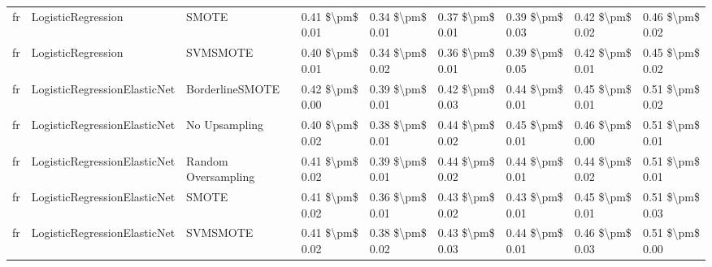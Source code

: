 \begin{tabular}{lllllllll}
      fr &              LogisticRegression &                         SMOTE & 0.41 \$\textbackslash pm\$ 0.01 &           0.34 \$\textbackslash pm\$ 0.01 &       0.37 \$\textbackslash pm\$ 0.01 &        0.39 \$\textbackslash pm\$ 0.03 &                         0.42 \$\textbackslash pm\$ 0.02 &     0.46 \$\textbackslash pm\$ 0.02 \\
      fr &              LogisticRegression &                      SVMSMOTE & 0.40 \$\textbackslash pm\$ 0.01 &           0.34 \$\textbackslash pm\$ 0.02 &       0.36 \$\textbackslash pm\$ 0.01 &        0.39 \$\textbackslash pm\$ 0.05 &                         0.42 \$\textbackslash pm\$ 0.01 &     0.45 \$\textbackslash pm\$ 0.02 \\
      fr &    LogisticRegressionElasticNet &               BorderlineSMOTE & 0.42 \$\textbackslash pm\$ 0.00 &           0.39 \$\textbackslash pm\$ 0.01 &       0.42 \$\textbackslash pm\$ 0.03 &        0.44 \$\textbackslash pm\$ 0.01 &                         0.45 \$\textbackslash pm\$ 0.01 &     0.51 \$\textbackslash pm\$ 0.02 \\
      fr &    LogisticRegressionElasticNet &                 No Upsampling & 0.40 \$\textbackslash pm\$ 0.02 &           0.38 \$\textbackslash pm\$ 0.01 &       0.44 \$\textbackslash pm\$ 0.02 &        0.45 \$\textbackslash pm\$ 0.01 &                         0.46 \$\textbackslash pm\$ 0.00 &     0.51 \$\textbackslash pm\$ 0.01 \\
      fr &    LogisticRegressionElasticNet &           Random Oversampling & 0.41 \$\textbackslash pm\$ 0.02 &           0.39 \$\textbackslash pm\$ 0.01 &       0.44 \$\textbackslash pm\$ 0.02 &        0.44 \$\textbackslash pm\$ 0.01 &                         0.44 \$\textbackslash pm\$ 0.02 &     0.51 \$\textbackslash pm\$ 0.01 \\
      fr &    LogisticRegressionElasticNet &                         SMOTE & 0.41 \$\textbackslash pm\$ 0.02 &           0.36 \$\textbackslash pm\$ 0.01 &       0.43 \$\textbackslash pm\$ 0.02 &        0.43 \$\textbackslash pm\$ 0.01 &                         0.45 \$\textbackslash pm\$ 0.01 &     0.51 \$\textbackslash pm\$ 0.03 \\
      fr &    LogisticRegressionElasticNet &                      SVMSMOTE & 0.41 \$\textbackslash pm\$ 0.02 &           0.38 \$\textbackslash pm\$ 0.02 &       0.43 \$\textbackslash pm\$ 0.03 &        0.44 \$\textbackslash pm\$ 0.01 &                         0.46 \$\textbackslash pm\$ 0.03 &     0.51 \$\textbackslash pm\$ 0.00 \\

\end{tabular}
